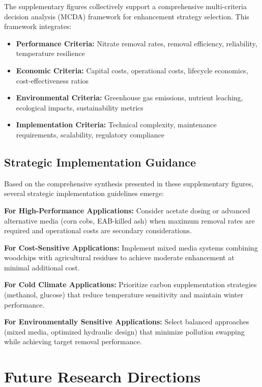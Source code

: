 \documentclass[12pt,a4paper]{article}
\begin{document}
The supplementary figures collectively support a comprehensive multi-criteria decision analysis (MCDA) framework for enhancement strategy selection. This framework integrates:

\begin{itemize}
\item \textbf{Performance Criteria:} Nitrate removal rates, removal efficiency, reliability, temperature resilience
\item \textbf{Economic Criteria:} Capital costs, operational costs, lifecycle economics, cost-effectiveness ratios
\item \textbf{Environmental Criteria:} Greenhouse gas emissions, nutrient leaching, ecological impacts, sustainability metrics
\item \textbf{Implementation Criteria:} Technical complexity, maintenance requirements, scalability, regulatory compliance
\end{itemize}

\subsection{Strategic Implementation Guidance}

Based on the comprehensive synthesis presented in these supplementary figures, several strategic implementation guidelines emerge:

\textbf{For High-Performance Applications:} Consider acetate dosing or advanced alternative media (corn cobs, EAB-killed ash) when maximum removal rates are required and operational costs are secondary considerations.

\textbf{For Cost-Sensitive Applications:} Implement mixed media systems combining woodchips with agricultural residues to achieve moderate enhancement at minimal additional cost.

\textbf{For Cold Climate Applications:} Prioritize carbon supplementation strategies (methanol, glucose) that reduce temperature sensitivity and maintain winter performance.

\textbf{For Environmentally Sensitive Applications:} Select balanced approaches (mixed media, optimized hydraulic design) that minimize pollution swapping while achieving target removal performance.

\section{Future Research Directions}
\end{document}

